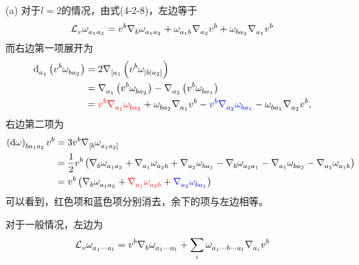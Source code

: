 \begin{xiti}
    \begin{zm}
    	\begin{enumerate}[listparindent=2em]
    		\item[(a)] 对于$l=2 $的情况，由式(4-2-8)，左边等于
    		\begin{displaymath}
    		\Ld{v} \tensor{\omega}{_{a_1 a_2}} = \tensor{v}{^b} \Nabla{b} \tensor{\omega}{_{a_1 a_2}} + \tensor{\omega}{_{a_1 b}} \Nabla{a_2} \tensor{v}{^b} + \tensor{\omega}{_{b a_2}} \Nabla{a_1} \tensor{v}{^b}
    		\end{displaymath}
    		而右边第一项展开为
    		\begin{align*}
    		\dd\indices{_{a_1}} \left( \tensor{v}{^b} \tensor{\omega}{_{b a_2}} \right) &= 2 \Nabla{[a_1} \left( \tensor{v}{^b} \tensor{\omega}{_{|b|a_2]}} \right)\\
    		&= \Nabla{a_1} \left( \tensor{v}{^b} \tensor{\omega}{_{b a_2}} \right) - \Nabla{a_2} \left( \tensor{v}{^b} \tensor{\omega}{_{b a_1}} \right)\\
    		&= {\color{red} \tensor{v}{^b} \Nabla{a_1} \tensor{\omega}{_{b a_2}} } + \tensor{\omega}{_{b a_2}} \Nabla{a_1} \tensor{v}{^b} - {\color{blue} \tensor{v}{^b} \Nabla{a_2} \tensor{\omega}{_{b a_1}}} - \tensor{\omega}{_{b a_1}} \Nabla{a_2} \tensor{v}{^b},
    		\end{align*}
    		右边第二项为
    		\begin{align*}
    		\tensor{\left(\dd{\omega}\right)}{_{b a_1 a_2}} \tensor{v}{^b} &= 3 \tensor{v}{^b} \Nabla{[b} \tensor{\omega}{_{a_1 a_2]}}\\
    		&= \frac{1}{2} \tensor{v}{^b} \left( \Nabla{b} \tensor{\omega}{_{a_1 a_2}} + \Nabla{a_1} \tensor{\omega}{_{a_2 b}} + \Nabla{a_2} \tensor{\omega}{_{b a_1}} - \Nabla{b} \tensor{\omega}{_{a_2 a_1}} - \Nabla{a_1} \tensor{\omega}{_{b a_2}} - \Nabla{a_2} \tensor{\omega}{_{a_1 b}} \right)\\
    		&= \tensor{v}{^b} \left( \Nabla{b} \tensor{\omega}{_{a_1 a_2}} + {\color{red} \Nabla{a_1} \tensor{\omega}{_{a_2 b}}} + {\color{blue} \Nabla{a_2} \tensor{\omega}{_{b a_1}} } \right)
    		\end{align*}
    		可以看到，红色项和蓝色项分别消去，余下的项与左边相等。
    		
    		对于一般情况，左边为
    		\begin{displaymath}
    		\Ld{v} \tensor{\omega}{_{a_1 \cdots a_l}} = \tensor{v}{^b} \Nabla{b} \tensor{\omega}{_{a_1 \cdots a_l}} + \sum_{i} \tensor{\omega}{_{a_1 \cdots b \cdots a_l}} \Nabla{a_i} \tensor{v}{^b}
    		\end{displaymath}
    		

\end{enumerate}
\end{zm}
\end{xiti}
